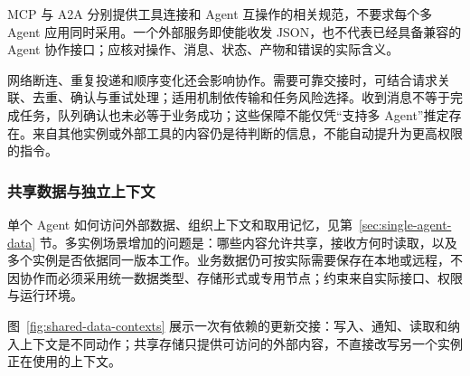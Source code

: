\documentclass[11pt,a4paper]{article}
\begin{document}
MCP 与 A2A 分别提供工具连接和 Agent 互操作的相关规范，不要求每个多 Agent 应用同时采用\cite{mcp-transports,a2a-spec}。一个外部服务即使能收发 JSON，也不代表已经具备兼容的 Agent 协作接口；应核对操作、消息、状态、产物和错误的实际含义。

网络断连、重复投递和顺序变化还会影响协作。需要可靠交接时，可结合请求关联、去重、确认与重试处理；适用机制依传输和任务风险选择。收到消息不等于完成任务，队列确认也未必等于业务成功；这些保障不能仅凭“支持多 Agent”推定存在。来自其他实例或外部工具的内容仍是待判断的信息，不能自动提升为更高权限的指令。

\subsubsection{共享数据与独立上下文}

单个 Agent 如何访问外部数据、组织上下文和取用记忆，见第~\ref{sec:single-agent-data} 节。多实例场景增加的问题是：哪些内容允许共享，接收方何时读取，以及多个实例是否依据同一版本工作。业务数据仍可按实际需要保存在本地或远程，不因协作而必须采用统一数据类型、存储形式或专用节点；约束来自实际接口、权限与运行环境。




图~\ref{fig:shared-data-contexts} 展示一次有依赖的更新交接：写入、通知、读取和纳入上下文是不同动作；共享存储只提供可访问的外部内容，不直接改写另一个实例正在使用的上下文。
\end{document}
